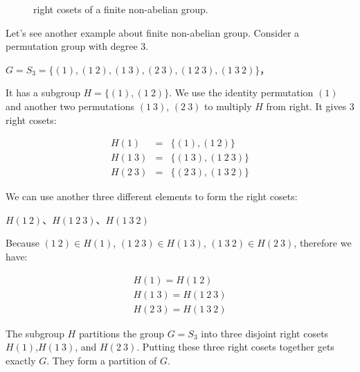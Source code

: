 \documentclass[b5paper]{article}
\begin{document}
\begin{figure}[htbp]
\centering
{}
\caption{right cosets of a finite non-abelian group.}
\label{fig:right-cosets-S3}
\end{figure}

Let's see another example about finite non-abelian group. Consider a permutation group with degree 3.

$G = S_3 = \{(1), (1\ 2), (1\ 3), (2\ 3), (1\ 2\ 3), (1\ 3\ 2)\}$，

It has a subgroup $H = \{(1), (1\ 2)\}$. We use the identity permutation $(1)$ and another two permutations $(1\ 3)$, $(2\ 3)$ to multiply $H$ from right. It gives 3 right cosets:

\[
\begin{array}{rcl}
H(1) & = & \{(1), (1\ 2)\} \\
H(1\ 3) & = & \{(1\ 3), (1\ 2\ 3)\} \\
H(2\ 3) & = & \{(2\ 3), (1\ 3\ 2)\}
\end{array}
\]

We can use another three different elements to form the right cosets:

$H(1\ 2)$、$H(1\ 2\ 3)$、$H(1\ 3\ 2)$

Because $(1\ 2) \in H(1)$, $(1\ 2\ 3) \in H(1\ 3)$, $(1\ 3\ 2) \in H(2\ 3)$, therefore we have:

\[
\begin{array}{l}
H(1) = H(1\ 2) \\
H(1\ 3) = H(1\ 2\ 3) \\
H(2\ 3) = H(1\ 3\ 2)
\end{array}
\]

The subgroup $H$ partitions the group $G = S_3$ into three disjoint right cosets $H(1)$,$H(1\ 3)$, and $H(2\ 3)$. Putting these three right cosets together gets exactly $G$. They form a partition of $G$.
\end{document}
